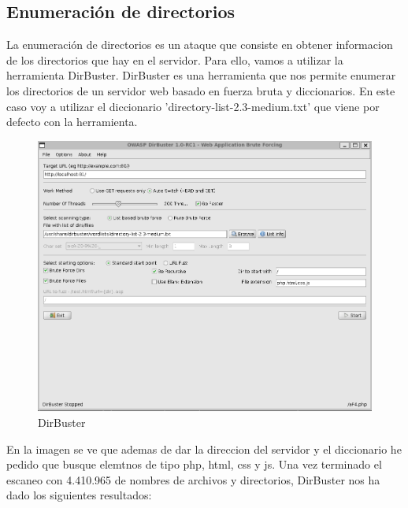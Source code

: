 \documentclass{report}
\begin{document}
            \subsection{Enumeración de directorios}
                La enumeración de directorios es un ataque que consiste en obtener informacion de los directorios que hay en el servidor.
                Para ello, vamos a utilizar la herramienta DirBuster.
                DirBuster es una herramienta que nos permite enumerar los directorios de un servidor web basado en fuerza bruta y diccionarios.
                En este caso voy a utilizar el diccionario 'directory-list-2.3-medium.txt' que viene por defecto con la herramienta.
                \begin{figure}[H]
                    \centering
                    \includegraphics[width=1\textwidth]{./img/vulnerabilidades/2.4/2.1.png}
                    \caption{DirBuster}
                \end{figure}
                En la imagen se ve que ademas de dar la direccion del servidor y el diccionario he pedido que busque elemtnos de tipo php, html, css y js.
                \clearpage
                Una vez terminado el escaneo con 4.410.965 de nombres de archivos y directorios, DirBuster nos ha dado los siguientes resultados:
\end{document}
